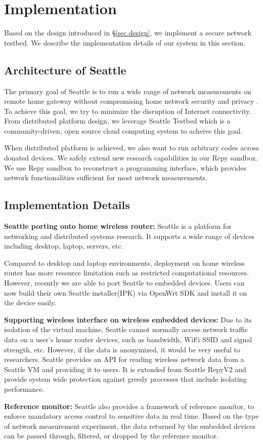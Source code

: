 \section{Implementation} 
\label{sec.implementation}

Based on the design introduced in \S{\ref{sec.design}}, we implement a 
secure network testbed. We describe the implementation details of our system 
in this section.

\subsection{Architecture of Seattle}
The primary goal of Seattle is to run a wide range of network measurements 
on remote home gateway without compromising home network security and privacy
. To achieve this goal, we try to minimize the disruption of Internet 
connectivity. From distributed platform design, we leverage Seattle Testbed 
which is a community-driven, open source cloud computing system to acheive 
this goal. 

When distributed platform is achieved, we also want to run arbitrary codes 
across donated devices. We safely extend new research capabilities in our 
Repy sandbox. We use Repy sandbox to reconstruct a programming interface, 
which provides network functionalities sufficient for most network 
measurements.

\subsection{Implementation Details}
\textbf{Seattle porting onto home wireless router:} 
Seattle is a platform for networking and distributed systems research. It 
supports a wide range of devices including desktop, laptop, servers, etc.

Compared to desktop and laptop environments, deployment on home wireless 
router has more resource limitation such as restricted computational 
resources. However, recently we are able to port Seattle to embedded devices.
Users can now build their own Seattle installer(IPK) via OpenWrt SDK and 
install it on the device easily. 

\textbf{Supporting wireless interface on wireless embedded devices:} 
Due to its isolation of the virtual machine, Seattle cannot normally access 
network traffic data on a user's home router devices, such as bandwidth, 
WiFi SSID and signal strength, etc. However, if the data is anonymized, it 
would be very useful to researchers. Seattle provides an API for reading 
wireless network data from a Seattle VM and providing it to users. It is 
extended from Seattle RepyV2 and provide system wide protection against 
greedy processes that include isolating performance. 

\textbf{Reference monitor:}
Seattle also provides a framework of reference monitor, to enforce mandatory 
access control to sensitive data in real time. Based on the type of network 
measurement experiment, the data returned by the embedded devices can be 
passed through, filtered, or dropped by the reference monitor.
